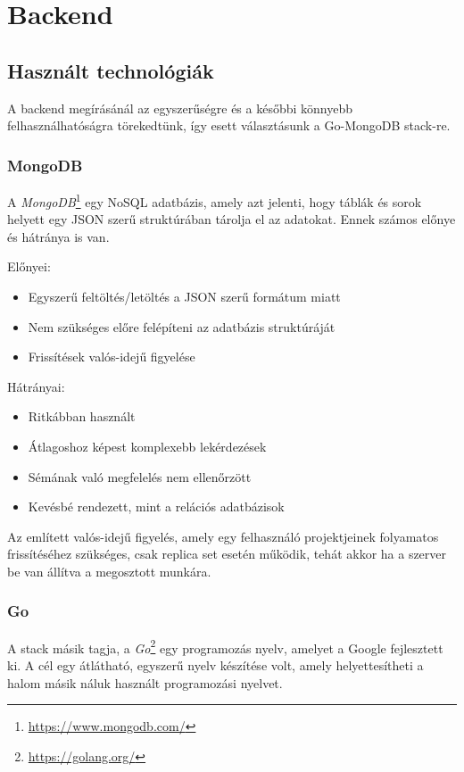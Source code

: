 \section{Backend}
\subsection{Használt technológiák}
A backend megírásánál az egyszerűségre és a későbbi könnyebb felhasználhatóságra törekedtünk, így esett választásunk a Go-MongoDB stack-re.
\subsubsection{MongoDB}
A \emph{MongoDB}\footnote{\url{https://www.mongodb.com/}} egy NoSQL adatbázis, amely azt jelenti, hogy táblák és sorok helyett egy JSON szerű struktúrában tárolja el az adatokat.
Ennek számos előnye és hátránya is van.

\begin{samepage}
  \noindent Előnyei:
  \begin{itemize}
    \item Egyszerű feltöltés/letöltés a JSON szerű formátum miatt
    \item Nem szükséges előre felépíteni az adatbázis struktúráját
    \item Frissítések valós-idejű figyelése
  \end{itemize}

  \noindent Hátrányai:
  \begin{itemize}
    \item Ritkábban használt
    \item Átlagoshoz képest komplexebb lekérdezések
    \item Sémának való megfelelés nem ellenőrzött
    \item Kevésbé rendezett, mint a relációs adatbázisok
  \end{itemize}
\end{samepage}

Az említett valós-idejű figyelés, amely egy felhasználó projektjeinek folyamatos frissítéséhez szükséges, csak replica set esetén működik, tehát akkor ha a szerver be van állítva a megosztott munkára.
\subsubsection{Go}
A stack másik tagja, a \emph{Go}\footnote{\url{https://golang.org/}} egy programozás nyelv, amelyet a Google fejlesztett ki. A cél egy átlátható, egyszerű nyelv készítése volt, amely helyettesítheti a halom másik náluk használt programozási nyelvet. \cite{golang}

